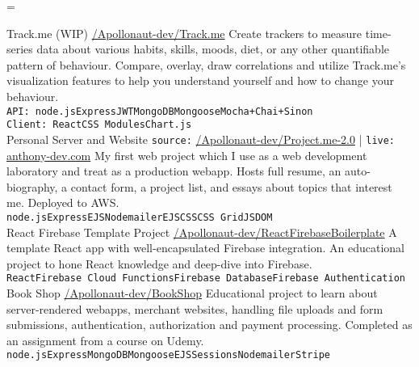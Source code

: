 \documentclass[9pt]{developercv}
\makeatletter
\let\realnormalsize=\normalsize
\def\liih@math{\ifmmode$\else\bad@math\fi}
\def\adjustnormalsize{\def\normalsize{\mathsurround=0pt \realnormalsize
 \parindent=0pt\abovedisplayskip=0pt\belowdisplayskip=0pt}%
 \def\phantompar{\csname par\endcsname}\normalsize}%
\newcommand\lthtmlvboxmathA{\adjustnormalsize\setbox\sizebox=\vbox\bgroup %
 \let\ifinner=\iffalse \let\)\liih@math }%
\newcommand\lthtmlmathtype[1]{\gdef\lthtmlmathenv{#1}}%
\newcommand\lthtmlfigureA[1]{\let\@savefreelist\@freelist
       \lthtmlmathtype{#1}\lthtmlvboxmathA}%
\makeatother
\begin{document}
\renewcommand{\headrulewidth}{0pt}
{\newpage\clearpage
\lthtmlfigureA{entrylist51}%
\begin{entrylist}
  \entryproject
    {Track.me (WIP)}
    {\href{https://github.com/Apollonaut-dev/Track.me}{/Apollonaut-dev/Track.me}}
    {Create trackers to measure time-series data about various habits, skills, moods, diet, or any other quantifiable pattern of behaviour. Compare, overlay, draw correlations and utilize Track.me's visualization features to help you understand yourself and how to change your behaviour.\smallskip\\\texttt{API: }\texttt{node.js}\slashsep\texttt{Express}\slashsep\texttt{JWT}\slashsep\texttt{MongoDB}\slashsep\texttt{Mongoose}\slashsep\texttt{Mocha+Chai+Sinon}\\\texttt{Client: }\texttt{React}\slashsep\texttt{CSS Modules}\slashsep\texttt{Chart.js}}
  \\
  \entryproject
    {Personal Server and Website}
    {\texttt{source:} \href{https://github.com/Apollonaut-dev/Project.me-2.0}{/Apollonaut-dev/Project.me-2.0} | \texttt{live:} \href{http://www.anthony-dev.com}{anthony-dev.com}}
    {My first web project which I use as a web development laboratory and treat as a production webapp. Hosts full resume, an auto-biography, a contact form, a project list, and essays about topics that interest me. Deployed to AWS.\smallskip\\\texttt{node.js}\slashsep\texttt{Express}\slashsep\texttt{EJS}\slashsep\texttt{Nodemailer}\slashsep\texttt{EJS}\slashsep\texttt{CSS}\slashsep\texttt{CSS Grid}\slashsep\texttt{JSDOM}}
  \\
  \entryproject
    {React Firebase Template Project}
    {\href{https://github.com/Apollonaut-dev/ReactFirebaseBoilerplate}{/Apollonaut-dev/ReactFirebaseBoilerplate}}
    {A template React app with well-encapsulated Firebase integration. An educational project to hone React knowledge and deep-dive into Firebase.\\\texttt{React}\slashsep\texttt{Firebase Cloud Functions}\slashsep\texttt{Firebase Database}\slashsep\texttt{Firebase Authentication}}
  \\
  \entryproject
    {Book Shop}
    {\href{https://github.com/Apollonaut-dev/BookShop}{/Apollonaut-dev/BookShop}}
    {Educational project to learn about server-rendered webapps, merchant websites, handling file uploads and form submissions, authentication, authorization and payment processing. Completed as an assignment from a course on Udemy. \smallskip\\\texttt{node.js}\slashsep\texttt{Express}\slashsep\texttt{MongoDB}\slashsep\texttt{Mongoose}\slashsep\texttt{EJS}\slashsep\texttt{Sessions}\slashsep\texttt{Nodemailer}\slashsep\texttt{Stripe}}

\end{entrylist}}
\end{document}
